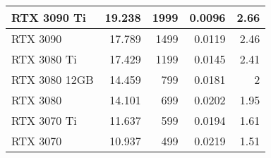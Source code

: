 \begin{table}[]
{\begin{tabular}{|l|r|r|r|r|}
RTX 3090 Ti   & 19.238                             & 1999                               & 0.0096                                                                                                               & 2.66                                                                                                             \\ \hline
RTX 3090      & 17.789                             & 1499                               & 0.0119                                                                                                               & 2.46                                                                                                             \\ \hline
RTX 3080 Ti   & 17.429                             & 1199                               & 0.0145                                                                                                               & 2.41                                                                                                             \\ \hline
RTX 3080 12GB & 14.459                             & 799                                & 0.0181                                                                                                               & 2                                                                                                                \\ \hline
RTX 3080      & 14.101                             & 699                                & 0.0202                                                                                                               & 1.95                                                                                                             \\ \hline
RTX 3070 Ti   & 11.637                             & 599                                & 0.0194                                                                                                               & 1.61                                                                                                             \\ \hline
RTX 3070      & 10.937                             & 499                                & 0.0219                                                                                                               & 1.51                                                                                                             \\ \hline

\end{tabular}}
\end{table}
